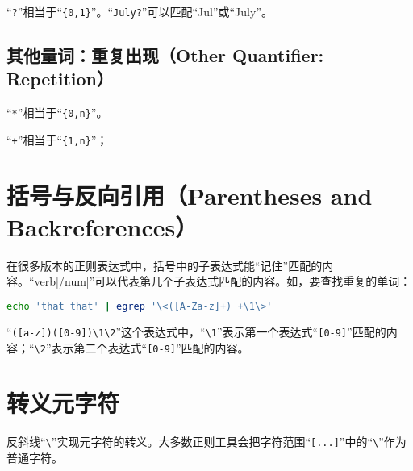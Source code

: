 “\verb|?|”相当于“\verb|{0,1}|”。“\verb|July?|”可以匹配“Jul”或“July”。

\subsection{其他量词：重复出现（Other Quantifier: Repetition）}

“\verb|*|”相当于“\verb|{0,n}|”。

“\verb|+|”相当于“\verb|{1,n}|”；



\section{括号与反向引用（Parentheses and Backreferences）}

在很多版本的正则表达式中，括号中的子表达式能“记住”匹配的内容。“verb|/num|”可以代表第几个子表达式匹配的内容。如，要查找重复的单词：

\begin{lstlisting}[language=bash]
echo 'that that' | egrep '\<([A-Za-z]+) +\1\>'
\end{lstlisting}

“\verb|([a-z])([0-9])\1\2|”这个表达式中，“\verb|\1|”表示第一个表达式“\verb|[0-9]|”匹配的内容；“\verb|\2|”表示第二个表达式“\verb|[0-9]|”匹配的内容。



\section{转义元字符}

反斜线“\verb|\|”实现元字符的转义。大多数正则工具会把字符范围“\verb|[...]|”中的“\verb|\|”作为普通字符。


